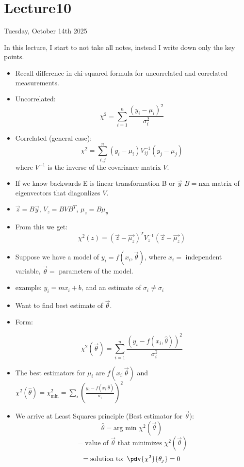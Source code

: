 \section{Lecture10}

Tuesday, October 14th 2025

In this lecture, I start to not take all notes, instead I write down only the key points.
\begin{itemize}
      \item Recall difference in chi-squared formula for uncorrelated and correlated measurements.
      \item Uncorrelated:
            \[ \chi^2 = \sum_{i=1}^{n} \frac{(y_i - \mu_i)^2}{\sigma_i^2} \]
      \item Correlated (general case):
            \[ \chi^2 = \sum_{i, j}^{n} (y_i - \mu_i) V^{-1}_{ij} (y_j - \mu_j) \]
            where $V^{-1}$ is the inverse of the covariance matrix $V$.
      \item If we know  backwards E is linear transformation B or $\vec{y}$ $B=$nxn matrix of eigenvectors that diagonlizes $V$.
      \item $\vec{z} = B \vec{y}$, $V_z = B V B^T$, $\mu_z = B \mu_y$
      \item From this we get:
            \[ \boxed{\chi^2(z) = \left( \vec{z} - \vec{\mu_z} \right)^T V_z^{-1} \left( \vec{z} - \vec{\mu_z} \right) }\]

      \item Suppose we have a model of $y_i = f(x_i, \vec{\theta})$, where $x_i =$ independent variable, $\vec{\theta}=$ parameters of the model.
      \item example: $y_i = m x_i + b$, and an estimate of $\sigma_i \neq \sigma_i$

      \item Want to find best estimate of $\vec{\theta}$.
      \item Form:

            \[ \chi^2(\vec{\theta}) = \sum_{i=1}^{n} \frac{(y_i - f(x_i, \hat{\theta}))^2}{\sigma_i^2} \]
      \item The best estimators for $\mu_i$ are $f(x_i|\vec{\theta})$ and $\chi^2(\hat{\theta}) = \chi^2_{\text{min}} = \sum_i \left( \frac{y_i - f(x_i|\hat{\theta})}{\sigma_i} \right)^2$
      \item We arrive at Least Squares principle (Best estimator for $\vec{\theta}$):
            \[ \hat{\theta} = \text{arg min } \chi^2(\vec{\theta}) \]
            \[ = \text{value of } \vec{\theta} \text{ that minimizes } \chi^2(\vec{\theta}) \]
            \[ = \text{solution to: } \pdv{\chi^2}{\theta_j} = 0 \]


\end{itemize}
